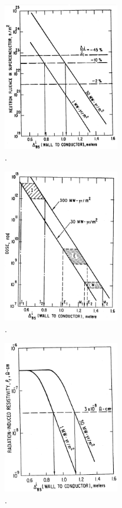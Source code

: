 \documentclass[11pt]{report} %
\begin{document}
\begin{figure}[H]
  \centering
  \includegraphics[width=0.45\textwidth]{figs/neutronFluence.png}
  \caption{.}
\end{figure}

\begin{figure}[H]
  \centering
  \includegraphics[width=0.45\textwidth]{figs/dose.png}
  \caption{.}
\end{figure}

\begin{figure}[H]
  \centering
  \includegraphics[width=0.45\textwidth]{figs/radInducedResistivity.png}
  \caption{.}
\end{figure}
\end{document}
